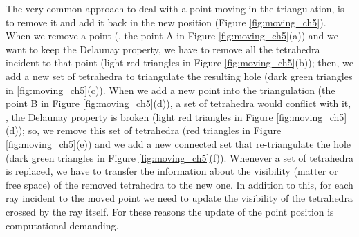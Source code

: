The very common approach to deal with a point moving in the triangulation, is to remove it and add it back in the new position \cite{cgal} (Figure \ref{fig:moving_ch5}). 
When we remove a point (\eg, the point A in Figure \ref{fig:moving_ch5}(a)) and we want to keep the Delaunay property, we have to remove all the tetrahedra incident to that point (light red triangles in Figure \ref{fig:moving_ch5}(b)); then, we add a new set of tetrahedra to triangulate the resulting hole (dark green triangles in \ref{fig:moving_ch5}(c)).
When we add a new point into the triangulation  (the point B in Figure \ref{fig:moving_ch5}(d)), a set of tetrahedra would conflict with it, \ie, the Delaunay property is broken (light red triangles in Figure \ref{fig:moving_ch5}(d)); so, we remove this set of tetrahedra  (red triangles in Figure \ref{fig:moving_ch5}(e)) and we add a new connected set that re-triangulate the hole (dark green triangles in Figure \ref{fig:moving_ch5}(f)).
Whenever a set of tetrahedra is replaced, we have to transfer the information about the visibility (matter or free space) of the removed tetrahedra to the new one. 
In addition to this, for each ray incident to the moved point we need to update the visibility of the tetrahedra crossed by the ray itself.
For these reasons the update of the point position is computational demanding.

